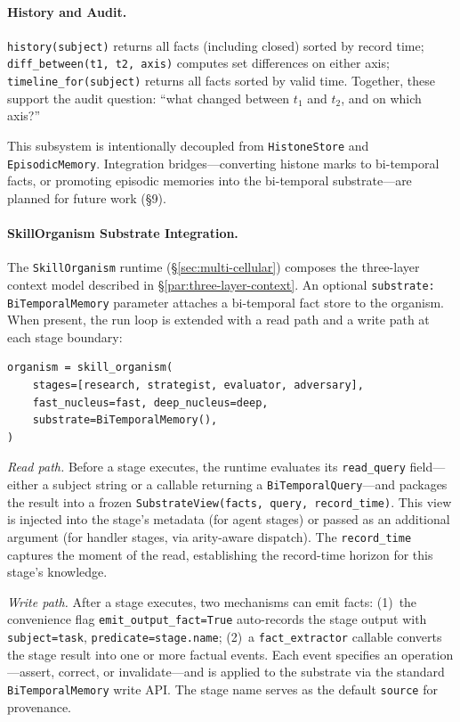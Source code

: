 \paragraph{History and Audit.}
\texttt{history(subject)} returns all facts (including closed) sorted by record time; \texttt{diff\_between(t1, t2, axis)} computes set differences on either axis; \texttt{timeline\_for(subject)} returns all facts sorted by valid time. Together, these support the audit question: ``what changed between $t_1$ and $t_2$, and on which axis?''

This subsystem is intentionally decoupled from \texttt{HistoneStore} and \texttt{EpisodicMemory}. Integration bridges---converting histone marks to bi-temporal facts, or promoting episodic memories into the bi-temporal substrate---are planned for future work (\S9).

\paragraph{SkillOrganism Substrate Integration.}
\label{sec:substrate-integration}
The \texttt{SkillOrganism} runtime (\S\ref{sec:multi-cellular}) composes the three-layer context model described in \S\ref{par:three-layer-context}. An optional \texttt{substrate: BiTemporalMemory} parameter attaches a bi-temporal fact store to the organism. When present, the run loop is extended with a read path and a write path at each stage boundary:

\begin{verbatim}
organism = skill_organism(
    stages=[research, strategist, evaluator, adversary],
    fast_nucleus=fast, deep_nucleus=deep,
    substrate=BiTemporalMemory(),
)
\end{verbatim}

\noindent\textit{Read path.}
Before a stage executes, the runtime evaluates its \texttt{read\_query} field---either a subject string or a callable returning a \texttt{BiTemporalQuery}---and packages the result into a frozen \texttt{SubstrateView(facts, query, record\_time)}. This view is injected into the stage's metadata (for agent stages) or passed as an additional argument (for handler stages, via arity-aware dispatch). The \texttt{record\_time} captures the moment of the read, establishing the record-time horizon for this stage's knowledge.

\noindent\textit{Write path.}
After a stage executes, two mechanisms can emit facts: (1)~the convenience flag \texttt{emit\_output\_fact=True} auto-records the stage output with \texttt{subject=task}, \texttt{predicate=stage.name}; (2)~a \texttt{fact\_extractor} callable converts the stage result into one or more factual events. Each event specifies an operation---assert, correct, or invalidate---and is applied to the substrate via the standard \texttt{BiTemporalMemory} write API. The stage name serves as the default \texttt{source} for provenance.

